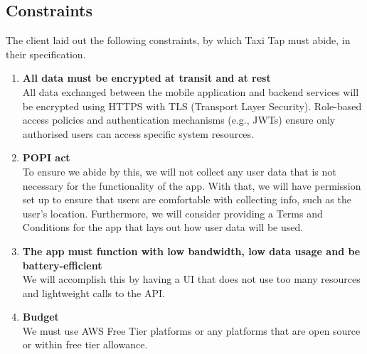 \documentclass[a4paper,12pt]{article}
\begin{document}
\subsection{Constraints}
The client laid out the following constraints, by which Taxi Tap must abide, in their specification.

\begin{enumerate}
    \item \textbf{All data must be encrypted at transit and at rest}\\
    All data exchanged between the mobile application and backend services will be encrypted using HTTPS with TLS (Transport Layer Security). Role-based access policies and authentication mechanisms (e.g., JWTs) ensure only authorised users can access specific system resources.

    \item \textbf{POPI act}\\
    To ensure we abide by this, we will not collect any user data that is not necessary for the functionality of the app. With that, we will have permission set up to ensure that users are comfortable with collecting info, such as the user’s location. Furthermore, we will consider providing a Terms and Conditions for the app that lays out how user data will be used.

    \item \textbf{The app must function with low bandwidth, low data usage and be battery-efficient}\\
    We will accomplish this by having a UI that does not use too many resources and lightweight calls to the API.

    \item \textbf{Budget}\\
    We must use AWS Free Tier platforms or any platforms that are open source or within free tier allowance.
\end{enumerate}
\end{document}
